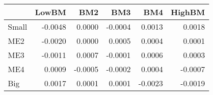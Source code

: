 \begin{tabular}{lrrrrr}
\toprule
{} &   LowBM &     BM2 &     BM3 &     BM4 &  HighBM \\
\midrule
Small & -0.0048 &  0.0000 & -0.0004 &  0.0013 &  0.0018 \\
ME2   & -0.0020 &  0.0000 &  0.0005 &  0.0004 &  0.0001 \\
ME3   & -0.0011 &  0.0007 & -0.0001 &  0.0006 &  0.0003 \\
ME4   &  0.0009 & -0.0005 & -0.0002 &  0.0004 & -0.0007 \\
Big   &  0.0017 &  0.0001 &  0.0001 & -0.0023 & -0.0019 \\
\bottomrule
\end{tabular}
